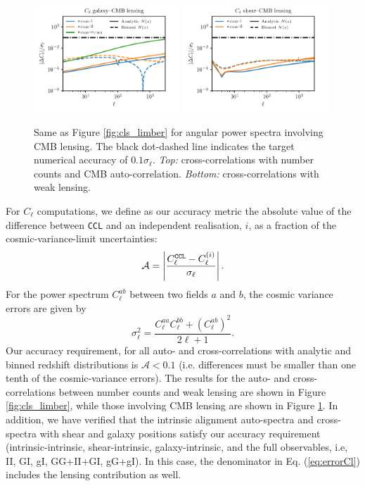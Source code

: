 \documentclass[\docopts]{\docclass}
\newcommand{\ccl}{{\tt CCL}\xspace}
\begin{document}
\begin{figure}
\includegraphics[width=0.49\textwidth]{Cl_dc}
\includegraphics[width=0.49\textwidth]{Cl_lc}
\caption{Same as Figure \ref{fig:cls_limber} for angular power spectra involving CMB lensing. The black dot-dashed line indicates the target numerical accuracy of $0.1\sigma_\ell$. {\sl Top:} cross-correlations with number counts and CMB auto-correlation. {\sl Bottom:} cross-correlations with weak lensing.}
\label{fig:cls_cmblens}
\end{figure}

For $C_\ell$ computations, we define as our accuracy metric the absolute value of the difference between \ccl and an independent realisation, $i$, as a fraction of the cosmic-variance-limit uncertainties:
\begin{equation}
  \mathcal{A}=\left|\frac{C_\ell^{\tt CCL}-C_\ell^{(i)}}{\sigma_\ell}\right|.
  \label{eq:errorCl}
\end{equation}
For the power spectrum $C^{ab}_\ell$ between two fields $a$ and $b$, the cosmic variance errors are given by
\begin{equation}
  \sigma_\ell^2=\frac{C^{aa}_\ell C^{bb}_\ell+(C^{ab}_\ell)^2}{2\ell+1}.
  \label{eq:sigmaell}
\end{equation}
Our accuracy requirement, for all auto- and cross-correlations with analytic and binned redshift distributions is $\mathcal{A}<0.1$ (i.e. differences must be smaller than one tenth of the cosmic-variance errors). The results for the auto- and cross-correlations between number counts and weak lensing are shown in Figure \ref{fig:cls_limber}, while those involving CMB lensing are shown in Figure \ref{fig:cls_cmblens}. In addition, we have verified that the intrinsic alignment auto-spectra and cross-spectra with shear and galaxy positions satisfy our accuracy requirement (intrinsic-intrinsic, shear-intrinsic, galaxy-intrinsic, and the full observables, i.e, II, GI, gI, GG+II+GI, gG+gI). In this case, the denominator in Eq. (\ref{eq:errorCl}) includes the lensing contribution as well.
\end{document}

